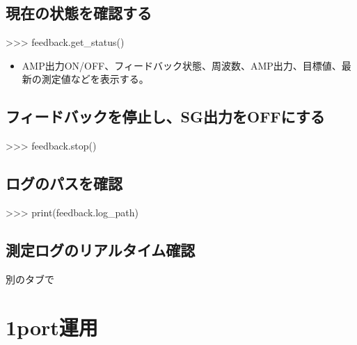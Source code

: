 \documentclass[a4paper,11pt]{ltjsarticle}
\begin{document}
\subsection{現在の状態を確認する}

\begin{command}

>>> feedback.get_status()

\end{command}

\begin{itemize}

\item AMP出力ON/OFF、フィードバック状態、周波数、AMP出力、目標値、最新の測定値などを表示する。

\end{itemize}

\subsection{フィードバックを停止し、SG出力をOFFにする}

\begin{command}

>>> feedback.stop()

\end{command}

\subsection{ログのパスを確認}

\begin{command}

>>> print(feedback.log_path)

\end{command}

\subsection{測定ログのリアルタイム確認}

別のタブで


\begin{command}


\end{command}

\section{1port運用}
\end{document}
